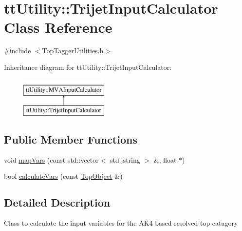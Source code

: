 \hypertarget{classttUtility_1_1TrijetInputCalculator}{\section{tt\-Utility\-:\-:Trijet\-Input\-Calculator Class Reference}
\label{classttUtility_1_1TrijetInputCalculator}
}


{\ttfamily \#include $<$Top\-Tagger\-Utilities.\-h$>$}

Inheritance diagram for tt\-Utility\-:\-:Trijet\-Input\-Calculator\-:\begin{figure}[H]
\begin{center}
\leavevmode
\includegraphics[height=2.000000cm]{classttUtility_1_1TrijetInputCalculator}
\end{center}
\end{figure}
\subsection*{Public Member Functions}
\begin{DoxyCompactItemize}
\item 
void \hyperlink{classttUtility_1_1TrijetInputCalculator_ae51335839fc75caf28e4ec030a3cfb40}{map\-Vars} (const std\-::vector$<$ std\-::string $>$ \&, float $\ast$)
\item 
bool \hyperlink{classttUtility_1_1TrijetInputCalculator_a02c32e65787b891edfe9b85c32aff8b0}{calculate\-Vars} (const \hyperlink{classTopObject}{Top\-Object} \&)
\end{DoxyCompactItemize}


\subsection{Detailed Description}
Class to calculate the input variables for the A\-K4 based resolved top catagory 

